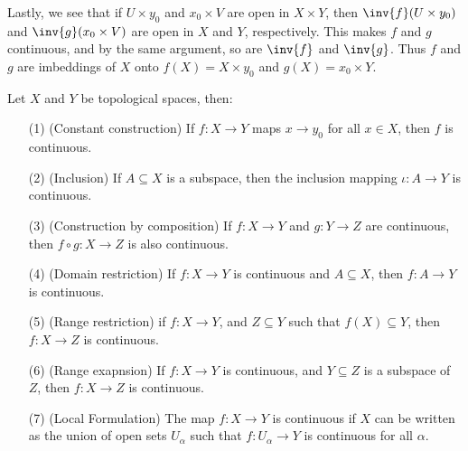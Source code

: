 \begin{example}
\begin{enumerate}
             Lastly, we see that if  $U \times y_0$ and $ x_0 \times V$ are open
             in $X \times Y$, then $\inv{f}(U \times y_0)$ and $\inv{g}(x_0
             \times V)$ are open in $X$ and  $Y$, respectively. This makes  $f$
             and  $g$ continuous, and by the same argument, so are  $\inv{f}$
             and $\inv{g}$. Thus $f$ and  $g$ are imbeddings of  $X$ onto $f(X)=
             X \times y_0$ and $g(X)=x_0 \times Y$.
    \end{enumerate}
\end{example}

\begin{theorem}\label{1.7.4}
    Let $X$ and  $Y$ be topological spaces, then:
        \begin{enumerate}
            \item[(1)] (Constant construction) If $f:X \rightarrow Y$ maps  $x \rightarrow y_0$ for all
                $x \in X$, then  $f$ is continuous.

            \item[(2)]  (Inclusion) If $A \subseteq X$ is a subspace, then the inclusion mapping  $\iota:A
                \rightarrow Y$ is continuous.

            \item[(3)] (Construction by composition) If $f:X \rightarrow Y$ and  $g:Y \rightarrow Z$ are
                continuous, then  $f \circ g: X \rightarrow Z$ is also continuous.

            \item[(4)]  (Domain restriction) If  $f:X \rightarrow Y$ is continuous and  $A \subseteq X$,
                then  $f:A \rightarrow Y$ is continuous.

            \item[(5)]  (Range restriction) if $f:X \rightarrow Y$, and  $Z \subseteq Y$ such that  $f(X)
                \subseteq Y$, then $f:X \rightarrow Z$ is continuous.

            \item[(6)]  (Range exapnsion) If $f:X \rightarrow Y$ is continuous, and  $Y \subseteq Z$ is a
                subspace of  $Z$, then  $f:X \rightarrow Z$ is continuous.

            \item[(7)]  (Local Formulation) The map $f:X \rightarrow Y$ is continuous if  $X$ can be
                written as the union of open sets  $U_{\alpha}$ such that $f:U_{\alpha} \rightarrow
                Y$ is continuous for all $\alpha$.
        \end{enumerate}
\end{theorem}
